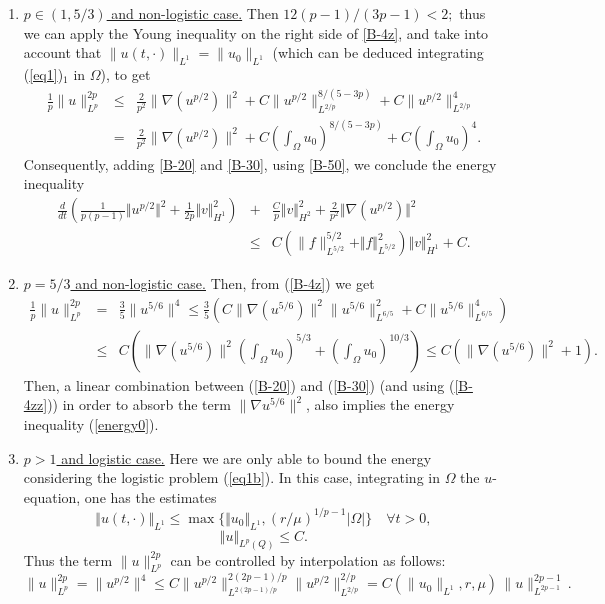 \documentclass[11pt,reqno]{amsart}%
\numberwithin{equation}{section}
\begin{document}
\begin{enumerate}
\item 
\underline {$p\in\left(1,5/3\right)$ and non-logistic case.} Then $12(p-1)/(3p-1)<2;$ thus we can apply the Young inequality on the right side of \eqref{B-4z}, and take into account that $\|u(t,\cdot )\|_{L^1}=\|u_0\|_{L^1}$ 
 (which can be  deduced integrating (\ref{eq1})$_1$ in $\Omega$), to get
\begin{eqnarray}
\frac{1}{p}\|u\|^{2p}_{L^p}
&\le&\frac{2}{p^2}\|\nabla (u^{p/2})\|^2+C\|u^{p/2}\|^{8/(5-3p)}_{L^{2/p}}
+C\|u^{p/2}\|^4_{L^{2/p}}\nonumber\\
&=&\frac{2}{p^2}\|\nabla (u^{p/2})\|^2+C\left(\int_\Omega u_{0}\right)^{8/(5-3p)}+C\left(\int_\Omega u_{0}\right)^4.\label{B-50}
\end{eqnarray}
Consequently, adding \eqref{B-20} and \eqref{B-30}, using \eqref{B-50}, we conclude the energy inequality
\begin{eqnarray}\label{energy0}
\frac{d}{dt}\left( \frac{1}{p(p-1)}\Vert  u^{p/2}\Vert^2
+\frac{1}{2p}\Vert v\Vert_{H^1}^2\right)
&+&{\frac{C}{p}\Vert v\Vert_{H^2}^2}+\frac{2}{p^2}\Vert \nabla (u^{p/2})\Vert^2
\nonumber\\
&\leq & {C\left(\|f\|^{5/2}_{L^{5/2}}+\Vert f\Vert^2_{L^{5/2}}\right)\Vert v\Vert^2_{H^1}+C}.
\end{eqnarray}
\item
\underline{ $p=5/3$ and non-logistic case.} Then, from (\ref{B-4z}) we get
\begin{eqnarray}
\frac{1}{p}\|u\|^{2p}_{L^p}&=&\frac{3}{5}\|u^{5/6}\|^4\le\frac{3}{5}\left(C\|\nabla (u^{5/6})\|^{2}\|u^{5/6}\|^{2}_{L^{6/5}}+C\|u^{5/6}\|^4_{L^{6/5}}\right)\nonumber\\
&\le& C\left(\|\nabla (u^{5/6})\|^{2}\left(\int_\Omega u_{0}\right)^{5/3}+\left(\int_\Omega u_{0}\right)^{10/3}\right)
\le C\left(\|\nabla (u^{5/6})\|^{2}+1 \right).
\label{B-4zz}
\end{eqnarray}
Then, a linear combination between (\ref{B-20}) and (\ref{B-30}) (and using (\ref{B-4zz})) in order to absorb the term 
$\|\nabla u^{5/6}\|^{2}$, also implies the energy inequality (\ref{energy0}).



\item \underline{$p>1$ and logistic case.} Here we are only able to bound the energy considering the logistic problem (\ref{eq1b}). In this case, integrating in $\Omega$ the
$u$-equation, one has the estimates
$$
\Vert u(t,\cdot) \Vert_{L^1} \le \max\{\Vert u_0 \Vert_{L^1},\left(r/\mu\right)^{{1}/{p-1}} \vert \Omega \vert \}
\quad \forall t>0,$$
$$\Vert u\Vert_{L^p(Q)}\leq C.$$
Thus the term $\|u\|_{L^p}^{2p}$ can be controlled by  interpolation 
 as follows:
\begin{equation}\label{ps-110}
\|u\|_{L^p}^{2p}=\|u^{p/2}\|^4
\le C\|u^{p/2}\|_{L^{2(2p-1)/p}}^{2(2p-1)/p}\|u^{p/2}\|_{L^{2/p}}^{2/p}
= C(\|u_0\|_{L^{1}},r,\mu)\, \|u\|_{L^{2p-1}}^{2p-1} \, .
\end{equation}
 



\end{enumerate}
\end{document}
